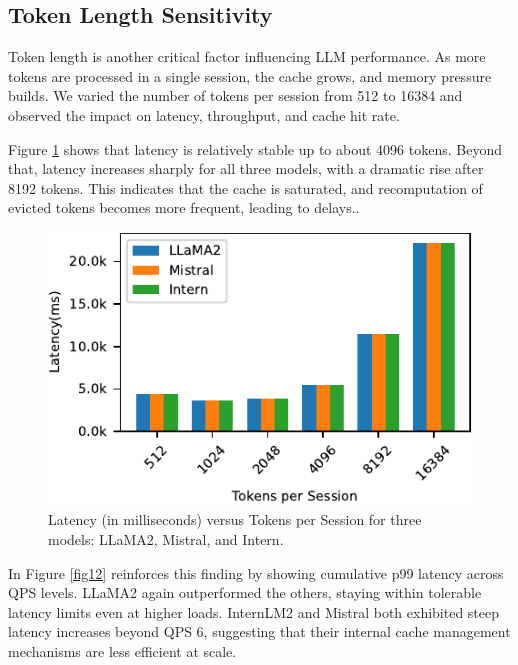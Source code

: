 \documentclass[sigconf,nonacm]{acmart}
\begin{document}
\subsection{Token Length Sensitivity}
Token length is another critical factor influencing LLM performance. As more tokens are processed in a single session, the cache grows, and memory pressure builds. We varied the number of tokens per session from 512 to 16384 and observed the impact on latency, throughput, and cache hit rate.

Figure \ref{fig9} shows that latency is relatively stable up to about 4096 tokens. Beyond that, latency increases sharply for all three models, with a dramatic rise after 8192 tokens. This indicates that the cache is saturated, and recomputation of evicted tokens becomes more frequent, leading to delays..
\begin{figure} [h]
    \centering
   \includegraphics[scale=0.8]{figure9_latency_vs_tokens.pdf}
    \vspace{-1.0em}
    \caption{Latency (in milliseconds) versus Tokens per Session for three models: LLaMA2, Mistral, and Intern.}
    \vspace{-1.0em}  
    \label{fig9}
\end{figure}
\par In Figure \ref{fig12} reinforces this finding by showing cumulative p99 latency across QPS levels. LLaMA2 again outperformed the others, staying within tolerable latency limits even at higher loads. InternLM2 and Mistral both exhibited steep latency increases beyond QPS 6, suggesting that their internal cache management mechanisms are less efficient at scale.
\end{document}
